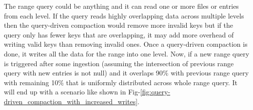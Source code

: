 The range query could be anything and it can read one or more files or entries from each level. If the query reads highly
overlapping data across multiple levels then the query-driven compaction would remove more invalid keys but if the query only 
has fewer keys that are overlapping, it may add more overhead of writing valid keys than removing invalid ones. 
Once a query-driven compaction is done, it writes all the data for the range into one level. Now, if a new range query is 
triggered after some ingestion (assuming the intersection of previous range query with new entries is not 
null) and it overlaps 90\% with previous range query with remaining 10\% that is uniformly 
distributed across whole range query. It will end up with a scenario like shown in Fig-\ref{fig:query-driven_compaction_with_increased_writes}.



\begin{table}
    \caption{Decision making data per level for each range query}
    \label{table:decision-making-meta-data}
\end{table}

